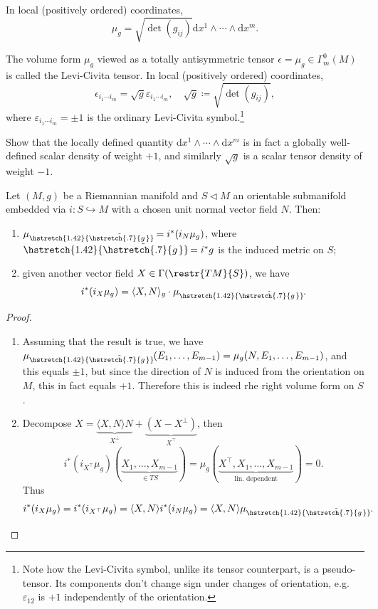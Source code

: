\documentclass[english,letterpaper]{article}%
\numberwithin{equation}{section}
\numberwithin{figure}{section}
\numberwithin{table}{section}
\theoremstyle{definition}
\theoremstyle{definition}
\theoremstyle{definition}
\theoremstyle{plain}
\theoremstyle{plain}
\theoremstyle{plain}
\theoremstyle{plain}
\theoremstyle{remark}
\theoremstyle{remark}
\newcommand{\dd}{{\mathrm{d}}}
\newcommand{\sub}{\vartriangleleft}
\newcommand\wt[1]{\hstretch{1.42}{\tilde{\hstretch{.7}{#1\mkern2mu}}}\mkern-2mu}
\begin{document}
In local (positively ordered) coordinates, \[\mu_g=\sqrt{\det(g_{ij})}\dd x^1\wedge\cdots\wedge \dd x^m.\]

\begin{defn}
    The volume form $\mu_g$ viewed as a totally antisymmetric tensor $\epsilon=\mu_g\in\Gamma^0_m(M)$ is called the Levi-Civita tensor. In local (positively ordered) coordinates,
    \[\epsilon_{i_1\cdots i_m}=\sqrt g\varepsilon_{i_1\cdots i_m},\quad \sqrt g\coloneqq\sqrt{\det(g_{ij})},\]
    where $\varepsilon_{i_1\cdots i_m}=\pm 1$ is the ordinary Levi-Civita symbol.\footnote{Note how the Levi-Civita symbol, unlike its tensor counterpart, is a pseudo-tensor. Its components don't change sign under changes of orientation, e.g. $\varepsilon_{12}$ is $+1$ independently of the orientation.}
\end{defn}

\begin{xca}
    Show that the locally defined quantity $\dd x^1\wedge\cdots \wedge\dd x^m$ is in fact a globally well-defined scalar density of weight $+1$, and similarly  $\sqrt{g}$ is a scalar tensor density of weight $-1$.
\end{xca}

\begin{prop}
    Let $(M,g)$ be a Riemannian manifold and $S\sub M$ an orientable submanifold embedded via $i:S\hookrightarrow M$ with a chosen unit normal vector field $N$. Then:
    \begin{enumerate}
        \item $\mu_{\wt{g}}=i^\ast (i_N \mu_g)$, where $\wt{g}=i^\ast g$ is the induced metric on $S$;
        \item given another vector field $X\in\Gamma(\restr{TM}{S})$, we have 
        \[i^\ast(i_X\mu_g)=\langle X,N\rangle_g \cdot \mu_{\wt{g}}.\]
    \end{enumerate}
\end{prop}
\begin{proof}
    \begin{enumerate}
        \item Assuming that the result is true, we have $\mu_{\wt{g}}(E_1,\ldots,E_{m-1})=\mu_g(N,E_1,\ldots,E_{m-1})$, and this equals $\pm 1$, but since the direction of $N$ is induced from the orientation on $M$, this in fact equals $+1$. Therefore this is indeed rhe right volume form on $S$.
        \item Decompose $X=\underbrace{\langle X,N\rangle N}_{X^\perp}+\underbrace{(X-X^\perp)}_{X^\top}$,
        then 
        \[i^\ast(i_{X^\top}\mu_g)(\underbrace{X_1,\ldots,X_{m-1}}_{\in TS})=\mu_g(\underbrace{X^\top,X_1,\ldots,X_{m-1}}_{\text{lin. dependent}})=0.\]
        Thus 
        \[i^\ast(i_X\mu_g)=i^\ast(i_{X^\top}\mu_g)=\langle X,N \rangle i^\ast (i_N \mu_g)=\langle X,N\rangle \mu_{\wt{g}}.\]
    \end{enumerate}
\end{proof}
\end{document}
